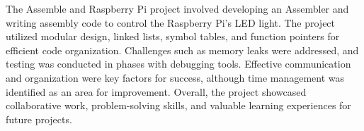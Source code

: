 \documentclass[12pt]{article}
\begin{document}
The Assemble and Raspberry Pi project involved developing an Assembler and writing assembly code to control the Raspberry Pi's LED light. The project utilized modular design, linked lists, symbol tables, and function pointers for efficient code organization. Challenges such as memory leaks were addressed, and testing was conducted in phases with debugging tools. Effective communication and organization were key factors for success, although time management was identified as an area for improvement. Overall, the project showcased collaborative work, problem-solving skills, and valuable learning experiences for future projects.
\end{document}
